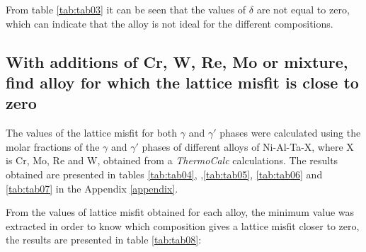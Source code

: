 From table \ref{tab:tab03} it can be seen that the values of $\delta$ are not equal to zero, which can indicate that the alloy is not ideal for the different compositions.

\newpage
\subsection{With additions of Cr, W, Re, Mo or mixture, find alloy for which the lattice misfit is close to zero}

The values of the lattice misfit for both $\gamma$ and $\gamma'$ phases were calculated using the molar fractions of the $\gamma$ and $\gamma'$ phases of different alloys of Ni-Al-Ta-X, where X is Cr, Mo, Re and W, obtained from a \textit{ThermoCalc} calculations. The results obtained are presented in tables \ref{tab:tab04}, ,\ref{tab:tab05}, \ref{tab:tab06} and \ref{tab:tab07} in the Appendix \ref{appendix}.

From the values of lattice misfit obtained for each alloy, the minimum value was extracted in order to know which composition gives a lattice misfit closer to zero, the results are presented in table \ref{tab:tab08}:

